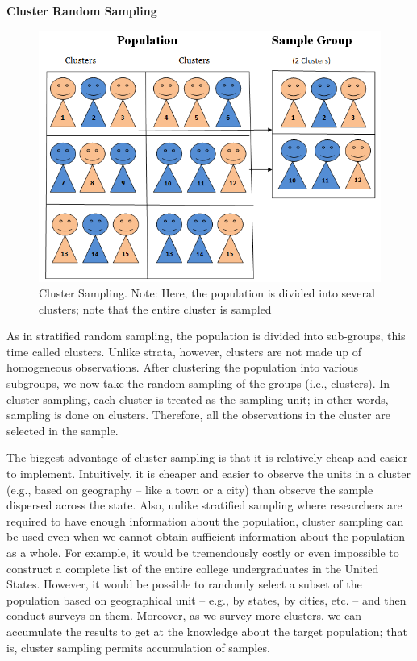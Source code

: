 \documentclass{book}
\begin{document}
\textbf{Cluster Random Sampling}

\begin{figure}
\hypertarget{fig:Cluster-sampling}{%
\centering
\includegraphics{images/surveys/Cluster-sampling.png}
\caption{Cluster Sampling. Note: Here, the population is divided into several
clusters; note that the entire cluster is sampled}\label{fig:Cluster-sampling}
}
\end{figure}

As in stratified random sampling, the population is divided into sub-groups,
this time called clusters. Unlike strata, however, clusters are not made up of
homogeneous observations. After clustering the population into various
subgroups, we now take the random sampling of the groups (i.e., clusters). In
cluster sampling, each cluster is treated as the sampling unit; in other
words, sampling is done on clusters. Therefore, all the observations in the
cluster are selected in the sample.

The biggest advantage of cluster sampling is that it is relatively cheap and
easier to implement. Intuitively, it is cheaper and easier to observe the
units in a cluster (e.g., based on geography -- like a town or a city) than
observe the sample dispersed across the state. Also, unlike stratified
sampling where researchers are required to have enough information about the
population, cluster sampling can be used even when we cannot obtain sufficient
information about the population as a whole. For example, it would be
tremendously costly or even impossible to construct a complete list of the
entire college undergraduates in the United States. However, it would be
possible to randomly select a subset of the population based on geographical
unit -- e.g., by states, by cities, etc. -- and then conduct surveys on them.
Moreover, as we survey more clusters, we can accumulate the results to get at
the knowledge about the target population; that is, cluster sampling permits
accumulation of samples.
\end{document}
